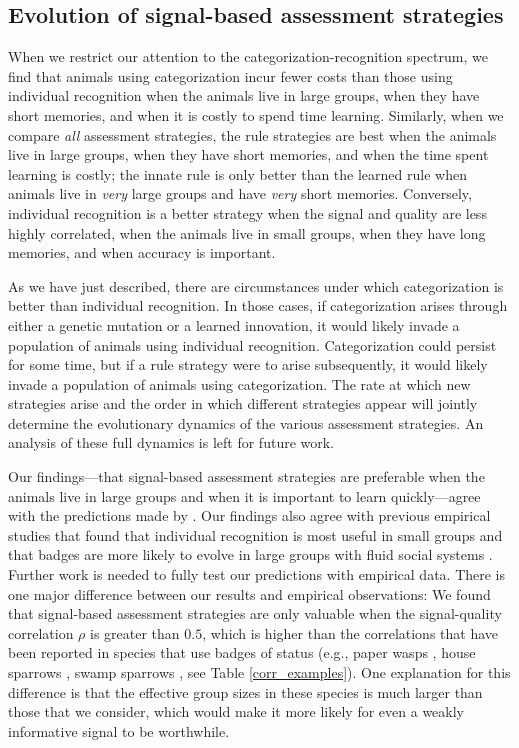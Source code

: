 \subsection*{Evolution of signal-based assessment strategies }

When we restrict our attention to the categorization-recognition spectrum, we find that animals using categorization incur fewer costs than those using individual recognition when the animals live in large groups, when they have short memories, and when it is costly to spend time learning. Similarly, when we compare \emph{all} assessment strategies, the rule strategies are best when the animals live in large groups, when they have short memories, and when the time spent learning is costly; the innate rule is only better than the learned rule when animals live in \emph{very} large groups and have \emph{very} short memories. Conversely, individual recognition is a better strategy when the signal and quality are less highly correlated, when the animals live in small groups, when they have long memories, and when accuracy is important. 

As we have just described, there are circumstances under which categorization is better than individual recognition. In those cases, if categorization arises through either a genetic mutation or a learned innovation, it would likely invade a population of animals using individual recognition. Categorization could persist for some time, but if a rule strategy were to arise subsequently, it would likely invade a population of animals using categorization. The rate at which new strategies arise and the order in which different strategies appear will jointly determine the evolutionary dynamics of the various assessment strategies. An analysis of these full dynamics is left for future work. 

Our findings---that signal-based assessment strategies are preferable when the animals live in large groups and when it is important to learn quickly---agree with the predictions made by \citet{sheehan2016evotradeoff}. Our findings also agree with previous empirical studies that found that individual recognition is most useful in small groups \citep{Veiga:1993fk} and that badges are more likely to evolve in large groups with fluid social systems \citep{Rohwer:1975fk,Tibbetts:2009kx}. Further work is needed to fully test our predictions with empirical data. There is one major difference between our results and empirical observations: We found that signal-based assessment strategies are only valuable when the signal-quality correlation $\rho$ is greater than $0.5$, which is higher than the correlations that have been reported in species that use badges of status (e.g., paper wasps \citep{Tibbetts:2004kx}, house sparrows \citep{Veiga:1993fk}, swamp sparrows \citep{Olsen:2010uq}, see Table \ref{corr_examples}). One explanation for this difference is that the effective group sizes in these species is much larger than those that we consider, which would make it more likely for even a weakly informative signal to be worthwhile. 

